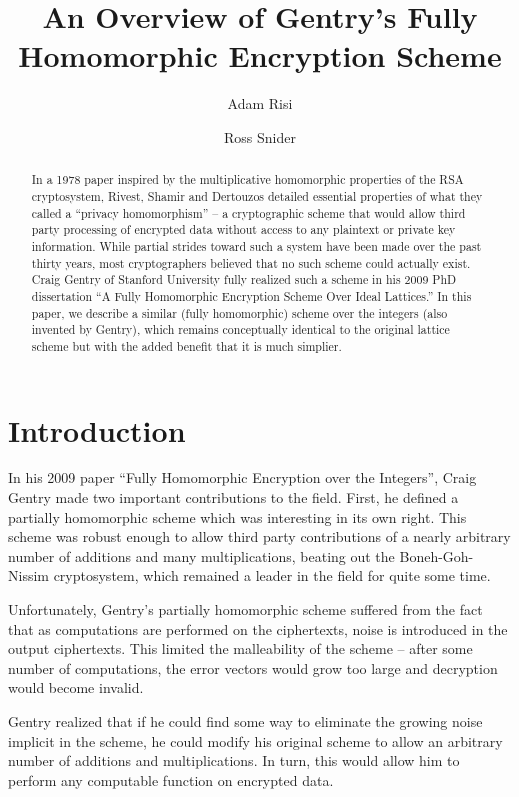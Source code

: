 \documentclass[a4paper,10pt]{article}
\title{An Overview of Gentry's Fully Homomorphic Encryption Scheme}
\author{Adam Risi \and Ross Snider}
\begin{document}
\maketitle
\titlepage
\tableofcontents
\pagebreak

\begin{abstract}
In a 1978 paper\cite{rad-priv} inspired by the multiplicative
homomorphic properties of the RSA cryptosystem, Rivest, Shamir and
Dertouzos detailed essential properties of what they called a “privacy
homomorphism” – a cryptographic scheme that would allow third party
processing of encrypted data without access to any plaintext or
private key information. While partial strides toward such a system
have been made over the past thirty years, most cryptographers
believed that no such scheme could actually exist. Craig Gentry of
Stanford University fully realized such a scheme in his 2009 PhD
dissertation “A Fully Homomorphic Encryption Scheme Over Ideal
Lattices.”\cite{gentry-lattice} In this paper, we describe a similar
(fully homomorphic) scheme over the integers (also invented by
Gentry), which remains conceptually identical to the original lattice
scheme but with the added benefit that it is much simplier.
\end{abstract}

\section{Introduction}
In his 2009 paper ``Fully Homomorphic Encryption over the
Integers''\cite{gentry-integers}, Craig Gentry made two important
contributions to the field. First, he defined a partially homomorphic
scheme which was interesting in its own right. This scheme was robust
enough to allow third party contributions of a nearly arbitrary number
of additions and many multiplications, beating out the
Boneh-Goh-Nissim cryptosystem, which remained a leader in the field
for quite some time.

Unfortunately, Gentry's partially homomorphic scheme suffered from the
fact that as computations are performed on the ciphertexts, noise is
introduced in the output ciphertexts. This limited the malleability of
the scheme – after some number of computations, the error vectors
would grow too large and decryption would become invalid.

Gentry realized that if he could find some way to eliminate the
growing noise implicit in the scheme, he could modify his original
scheme to allow an arbitrary number of additions and
multiplications. In turn, this would allow him to perform any
computable function on encrypted data.
\end{document}
